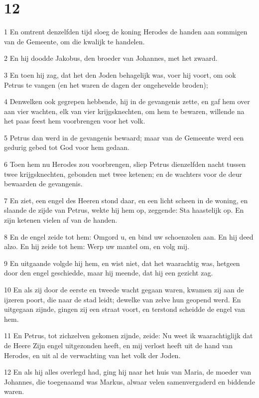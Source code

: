\chapter{12}

\par 1 En omtrent denzelfden tijd sloeg de koning Herodes de handen aan sommigen van de Gemeente, om die kwalijk te handelen.
\par 2 En hij doodde Jakobus, den broeder van Johannes, met het zwaard.
\par 3 En toen hij zag, dat het den Joden behagelijk was, voer hij voort, om ook Petrus te vangen (en het waren de dagen der ongehevelde broden);
\par 4 Denwelken ook gegrepen hebbende, hij in de gevangenis zette, en gaf hem over aan vier wachten, elk van vier krijgsknechten, om hem te bewaren, willende na het paas feest hem voorbrengen voor het volk.
\par 5 Petrus dan werd in de gevangenis bewaard; maar van de Gemeente werd een gedurig gebed tot God voor hem gedaan.
\par 6 Toen hem nu Herodes zou voorbrengen, sliep Petrus dienzelfden nacht tussen twee krijgsknechten, gebonden met twee ketenen; en de wachters voor de deur bewaarden de gevangenis.
\par 7 En ziet, een engel des Heeren stond daar, en een licht scheen in de woning, en slaande de zijde van Petrus, wekte hij hem op, zeggende: Sta haastelijk op. En zijn ketenen vielen af van de handen.
\par 8 En de engel zeide tot hem: Omgord u, en bind uw schoenzolen aan. En hij deed alzo. En hij zeide tot hem: Werp uw mantel om, en volg mij.
\par 9 En uitgaande volgde hij hem, en wist niet, dat het waarachtig was, hetgeen door den engel geschiedde, maar hij meende, dat hij een gezicht zag.
\par 10 En als zij door de eerste en tweede wacht gegaan waren, kwamen zij aan de ijzeren poort, die naar de stad leidt; dewelke van zelve hun geopend werd. En uitgegaan zijnde, gingen zij een straat voort, en terstond scheidde de engel van hem.
\par 11 En Petrus, tot zichzelven gekomen zijnde, zeide: Nu weet ik waarachtiglijk dat de Heere Zijn engel uitgezonden heeft, en mij verlost heeft uit de hand van Herodes, en uit al de verwachting van het volk der Joden.
\par 12 En als hij alles overlegd had, ging hij naar het huis van Maria, de moeder van Johannes, die toegenaamd was Markus, alwaar velen samenvergaderd en biddende waren.
